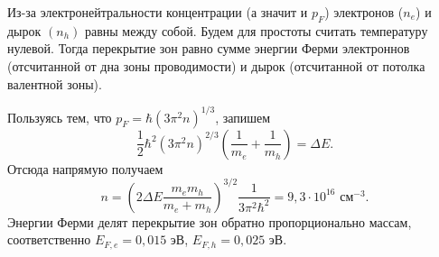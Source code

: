 \documentclass[a4paper]{article}
\begin{document}
\begin{hiProb}[4.12]
\end{hiProb}
\begin{sol}
	Из-за электронейтральности концентрации (а значит и $p_F$) электронов ($n_e$) и дырок
	$(n_h)$ равны между собой. Будем для
простоты считать температуру нулевой. Тогда
перекрытие зон равно сумме энергии Ферми электроннов
(отсчитанной от дна зоны проводимости) и
дырок (отсчитанной от потолка валентной зоны).

Пользуясь тем, что $p_F =\hbar (3\pi^2 n)^{1 /3}$,
запишем
\[
	\frac{1}{2} \hbar ^2 \left( 3\pi^2
	n \right) ^{2 /3} \left( 
\frac{1}{m_e}+ \frac{1}{m_h}\right) =\Delta E
.\] 
Отсюда напрямую получаем
\[
	n= \left( 2\Delta E \frac{m_e m_h}{m_e+m_h} \right) ^{3 /2} \frac{1}{3\pi^2 \hbar ^2}=
	9,3 \cdot 10^{16} \text{ см}^{-3}
.\] 
Энергии Ферми делят перекрытие зон обратно
пропорционально массам, соответственно $E_{F,e}=
0,015$ эВ, $E_{F,h}=0,025$ эВ.
\end{sol}
\end{document}
